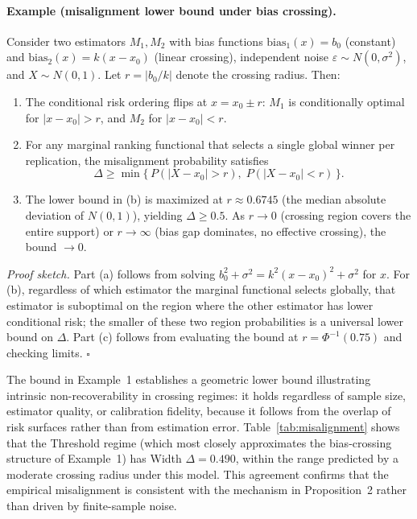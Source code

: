 \documentclass[a4paper,11pt]{article}
\begin{document}
\paragraph{Example (misalignment lower bound under bias crossing).}
Consider two estimators $M_1, M_2$ with bias functions $\text{bias}_1(x) = b_0$ (constant) and $\text{bias}_2(x) = k(x - x_0)$ (linear crossing), independent noise $\varepsilon \sim N(0, \sigma^2)$, and $X \sim N(0, 1)$. Let $r = |b_0 / k|$ denote the crossing radius. Then:
\begin{enumerate}
    \item[(a)] The conditional risk ordering flips at $x = x_0 \pm r$: $M_1$ is conditionally optimal for $|x - x_0| > r$, and $M_2$ for $|x - x_0| < r$.
    \item[(b)] For any marginal ranking functional that selects a single global winner per replication, the misalignment probability satisfies
    \begin{equation}
        \Delta \geq \min\bigl\{\,P(|X - x_0| > r),\; P(|X - x_0| < r)\,\bigr\}.
        \label{eq:delta-lower-bound}
    \end{equation}
    \item[(c)] The lower bound in (b) is maximized at $r \approx 0.6745$ (the median absolute deviation of $N(0,1)$), yielding $\Delta \geq 0.5$. As $r \to 0$ (crossing region covers the entire support) or $r \to \infty$ (bias gap dominates, no effective crossing), the bound $\to 0$.
\end{enumerate}
\emph{Proof sketch.} Part (a) follows from solving $b_0^2 + \sigma^2 = k^2(x - x_0)^2 + \sigma^2$ for $x$. For (b), regardless of which estimator the marginal functional selects globally, that estimator is suboptimal on the region where the other estimator has lower conditional risk; the smaller of these two region probabilities is a universal lower bound on $\Delta$. Part (c) follows from evaluating the bound at $r = \Phi^{-1}(0.75)$ and checking limits. $\square$

The bound in Example~1 establishes a geometric lower bound illustrating intrinsic non-recoverability in crossing regimes: it holds regardless of sample size, estimator quality, or calibration fidelity, because it follows from the overlap of risk surfaces rather than from estimation error. Table~\ref{tab:misalignment} shows that the Threshold regime (which most closely approximates the bias-crossing structure of Example~1) has Width $\Delta = 0.490$, within the range predicted by a moderate crossing radius under this model. This agreement confirms that the empirical misalignment is consistent with the mechanism in Proposition~2 rather than driven by finite-sample noise.
\end{document}
